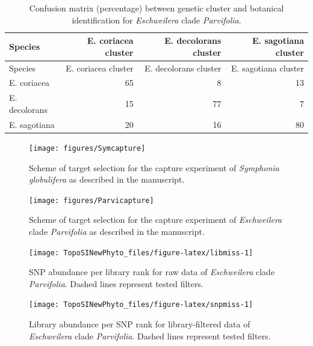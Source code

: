 \documentclass[12pt,]{article}
\begin{document}
\newpage

\begin{longtable}[]{@{}lrrr@{}}
\caption{\label{tab:kmeansConfusion}Confusion matrix (percentage) between genetic cluster and botanical identification for \emph{Eschweilera} clade \emph{Parvifolia}.}\tabularnewline
\toprule
Species & E. coriacea cluster & E. decolorans cluster & E. sagotiana cluster\tabularnewline
\midrule
\endfirsthead
\toprule
Species & E. coriacea cluster & E. decolorans cluster & E. sagotiana cluster\tabularnewline
\midrule
\endhead
E. coriacea & 65 & 8 & 13\tabularnewline
E. decolorans & 15 & 77 & 7\tabularnewline
E. sagotiana & 20 & 16 & 80\tabularnewline
\bottomrule
\end{longtable}

\newpage

\begin{figure}[H]

{\centering \texttt{[image: figures/Symcapture]} 

}

\caption{Scheme of target selection for the capture experiment of \emph{Symphonia globulifera} as described in the manuscript.}\label{fig:symcapture}
\end{figure}

\newpage

\begin{figure}[H]

{\centering \texttt{[image: figures/Parvicapture]} 

}

\caption{Scheme of target selection for the capture experiment of \emph{Eschweilera} clade \emph{Parvifolia} as described in the manuscript.}\label{fig:parvicapture}
\end{figure}

\newpage

\begin{figure}[H]

{\centering \texttt{[image: TopoSINewPhyto\_files/figure-latex/libmiss-1]} 

}

\caption{SNP abundance per library rank for raw data of \emph{Eschweilera} clade \emph{Parvifolia}. Dashed lines represent tested filters.}\label{fig:libmiss}
\end{figure}

\newpage

\begin{figure}[H]

{\centering \texttt{[image: TopoSINewPhyto\_files/figure-latex/snpmiss-1]} 

}

\caption{Library abundance per SNP rank for library-filtered data of \emph{Eschweilera} clade \emph{Parvifolia}. Dashed lines represent tested filters.}\label{fig:snpmiss}
\end{figure}
\end{document}
